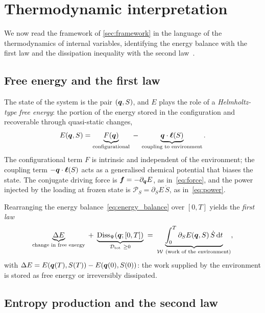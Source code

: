 \section{Thermodynamic interpretation}\label{sec:thermo}

We now read the framework of \cref{sec:framework} in the language of
the thermodynamics of internal variables, identifying the energy
balance with the first law and the dissipation inequality with the
second law~\cite{germain1983,halphen1975generalized}.

\subsection{Free energy and the first law}\label{sec:first_law}

The state of the system is the pair $(\bm{q}, S)$, and $E$ plays the role
of a \emph{Helmholtz-type free energy}: the portion of the energy
stored in the configuration and recoverable through quasi-static
changes,
\begin{equation}\label{eq:free_energy}
  E(\bm{q}, S) = \underbrace{F(\bm{q})}_{\text{configurational}}
  \;-\;\underbrace{\bm{q}\cdot\bm{\ell}(S)}_{\text{coupling to environment}}.
\end{equation}
The configurational term $F$ is intrinsic and independent of the
environment; the coupling term $-\bm{q}\cdot\bm{\ell}(S)$ acts as a
generalised chemical potential that biases the state. The conjugate
driving force is $\bm{f}=-\partial_{\bm{q}}E$, as in~\eqref{eq:force}, and
the power injected by the loading at frozen state is
$\mathcal P_S=\partial_S E\,\dot S$, as in~\eqref{eq:power}.

Rearranging the energy balance~\eqref{eq:energy_balance} over $[0,T]$
yields the \emph{first law}
\begin{equation}\label{eq:first_law}
  \underbrace{\Delta E}_{\text{change in free energy}}
  \;+\;
  \underbrace{\Diss_\Psi(\bs q;[0,T])}_{\mathcal D_{\mathrm{tot}}\ \ge 0}
  \;=\;
  \underbrace{\int_0^T \partial_S E(\bs q,S)\,\dot S\dd t}_{\mathcal W\ \text{(work of the environment)}},
\end{equation}
with $\Delta E=E(\bm{q}(T),S(T))-E(\bm{q}(0),S(0))$: the work supplied by
the environment is stored as free energy or irreversibly dissipated.

\subsection{Entropy production and the second law}\label{sec:second_law}

